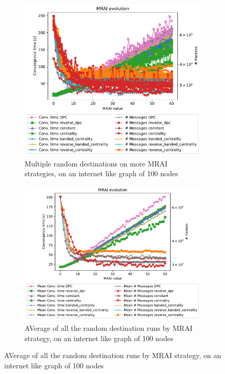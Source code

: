 \documentclass[10pt,conference,letterpaper]{IEEEtran}
\newcommand{\figwidth}{0.78}
\begin{document}
\begin{figure}[tb]
	\centering

	\begin{subfigure}{\columnwidth}
		\centering
		\includegraphics[width=\figwidth\columnwidth]{images/different_destinations/different_destinations-100_all}
		\caption{Multiple random destinations on more \ac{MRAI} strategies, on an internet like graph of \num{100} nodes}
		\label{fig:different_destinations-100_all}
		\qquad
	\end{subfigure}

	\begin{subfigure}{\columnwidth}
		\centering
		\includegraphics[width=\figwidth\columnwidth]{images/different_destinations/different_destinations-100_mean.pdf}
		\caption{AVerage of all the random destination runs by \ac{MRAI} strategy, on an internet like graph of \num{100} nodes}
		\label{fig:different_destinations-100_mean}
		\qquad
	\end{subfigure}


\end{figure}
\end{document}
